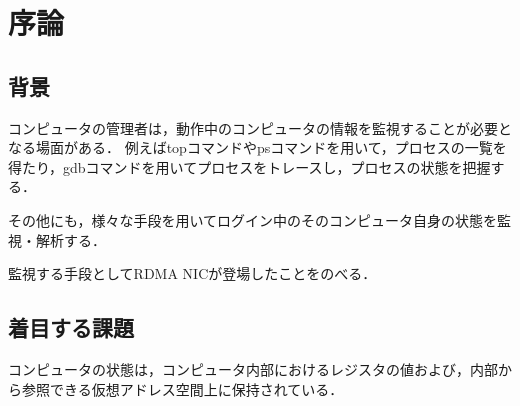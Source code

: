\chapter{序論}
\label{chap:introduction}

\section{背景}
\label{section:background}






コンピュータの管理者は，動作中のコンピュータの情報を監視することが必要となる場面がある．
例えばtopコマンドやpsコマンドを用いて，プロセスの一覧を得たり，gdbコマンドを用いてプロセスをトレースし，プロセスの状態を把握する．

その他にも，様々な手段を用いてログイン中のそのコンピュータ自身の状態を監視・解析する．

監視する手段としてRDMA NICが登場したことをのべる．

\section{着目する課題}

コンピュータの状態は，コンピュータ内部におけるレジスタの値および，内部から参照できる仮想アドレス空間上に保持されている．

